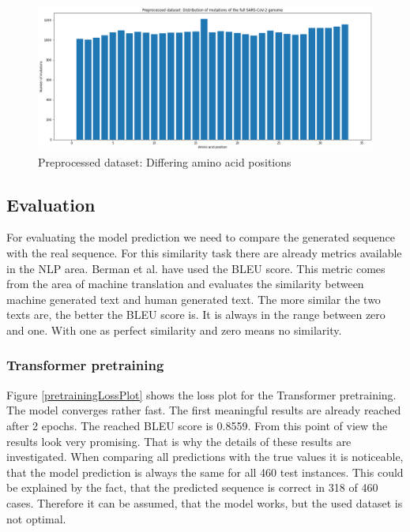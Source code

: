 \begin{figure}[ht]
	\centering
	\includegraphics[width=0.9\linewidth]{figures/preprocessedMutatedGeneticLoci.png}
	\caption{Preprocessed dataset: Differing amino acid positions \cite{own representation}}
	\label{preprocessedMutatedGeneticLoci}
\end{figure}

\newpage
\subsection{Evaluation}  \label{ch:experimentsB}

For evaluating the model prediction we need to compare the generated se\-quence with the real sequence. For this similarity task there are already metrics available in the \ac{NLP} area. Berman et al. \cite{Berman2020} have used the \ac{BLEU} score. This metric comes from the area of machine translation and evaluates the similarity between machine generated text and human generated text. The more similar the two texts are, the better the \ac{BLEU} score is. It is always in the range between zero and one. With one as perfect similarity and zero means no similarity.

\subsubsection{Transformer pretraining}  \label{ch:experimentsBa}

Figure \ref{pretrainingLossPlot} shows the loss plot for the Transformer pretraining. The model converges rather fast. The first meaningful results are already reached after 2 epochs. The reached BLEU score is 0.8559. From this point of view the results look very promising. That is why the details of these results are investigated. When comparing all predictions with the true values it is noticeable, that the model prediction is always the same for all 460 test instances. This could be explained by the fact, that the predicted sequence is correct in 318 of 460 cases. Therefore it can be assumed, that the model works, but the used dataset is not optimal.

